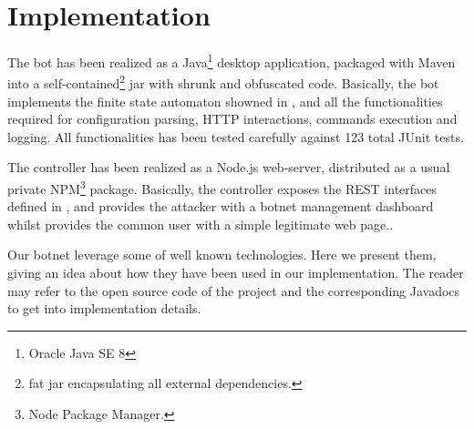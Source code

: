 \section{Implementation}
\label{sec:implementation}

The bot has been realized as a Java\footnote{Oracle Java SE 8} desktop application, packaged with Maven into a self-contained\footnote{fat jar encapsulating all external dependencies.} jar with shrunk and obfuscated code.
Basically, the bot implements the finite state automaton showned in , and all the functionalities required for configuration parsing, HTTP interactions, commands execution and logging. All functionalities has been tested carefully against 123 total JUnit tests.

The controller has been realized as a Node.js web-server, distributed as a usual private NPM\footnote{Node Package Manager.} package.
Basically, the controller exposes the REST interfaces defined in , and provides the attacker with a botnet management dashboard whilst provides the common user with a simple legitimate web page..

Our botnet leverage some of well known technologies. Here we present them, giving an idea about how they have been used in our implementation. The reader may refer to the open source code of the project and the corresponding Javadocs to get into implementation details.

